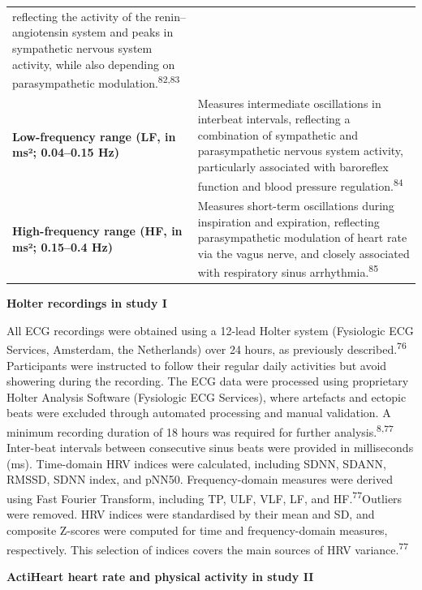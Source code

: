 \documentclass[
  a4paper,
  headsepline=true,
  open=left]{scrbook}
\begin{document}
\begin{longtable}[]{@{}
  >{\raggedright\arraybackslash}p{}
  >{\raggedright\arraybackslash}p{}@{}}
reflecting the activity of the renin--angiotensin system and peaks in
sympathetic nervous system activity, while also depending on
parasympathetic modulation.\textsuperscript{82,83} \\
\textbf{Low-frequency range (LF, in ms²; 0.04--0.15 Hz)} & Measures
intermediate oscillations in interbeat intervals, reflecting a
combination of sympathetic and parasympathetic nervous system activity,
particularly associated with baroreflex function and blood pressure
regulation.\textsuperscript{84} \\
\textbf{High-frequency range (HF, in ms²; 0.15--0.4 Hz)} & Measures
short-term oscillations during inspiration and expiration, reflecting
parasympathetic modulation of heart rate via the vagus nerve, and
closely associated with respiratory sinus
arrhythmia.\textsuperscript{85} \\
\end{longtable}

\textbf{Holter recordings in study I}

All ECG recordings were obtained using a 12-lead Holter system
(Fysiologic ECG Services, Amsterdam, the Netherlands) over 24 hours, as
previously described.\textsuperscript{76} Participants were instructed
to follow their regular daily activities but avoid showering during the
recording. The ECG data were processed using proprietary Holter Analysis
Software (Fysiologic ECG Services), where artefacts and ectopic beats
were excluded through automated processing and manual validation. A
minimum recording duration of 18 hours was required for further
analysis.\textsuperscript{8,77} Inter-beat intervals between consecutive
sinus beats were provided in milliseconds (ms). Time-domain HRV indices
were calculated, including SDNN, SDANN, RMSSD, SDNN index, and pNN50.
Frequency-domain measures were derived using Fast Fourier Transform,
including TP, ULF, VLF, LF, and HF.\textsuperscript{77}Outliers were
removed. HRV indices were standardised by their mean and SD, and
composite Z-scores were computed for time and frequency-domain measures,
respectively. This selection of indices covers the main sources of HRV
variance.\textsuperscript{77}

\textbf{ActiHeart heart rate and physical activity in study II}
\end{document}
